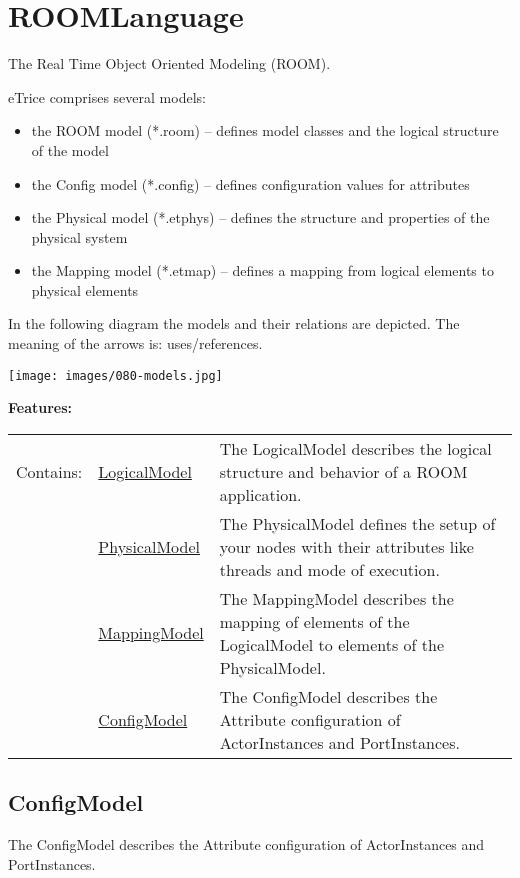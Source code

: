 \section{ROOMLanguage}
	\hypertarget{ref:ROOMLanguage}{}
	The Real Time Object Oriented Modeling (ROOM).
	
	eTrice comprises several models:
	
	\begin{itemize}
	\item the ROOM model (*.room) -- defines model classes and the logical structure of the model
	\item the Config model (*.config) -- defines configuration values for attributes
	\item the Physical model (*.etphys) -- defines the structure and properties of the physical system
	\item the Mapping model (*.etmap) -- defines a mapping from logical elements to physical elements
	\end{itemize}
	
	In the following diagram the models and their relations are depicted. The meaning of the arrows is: uses/references.
	\begin{center}
		\texttt{[image: images/080-models.jpg]}
	\end{center}
	
	\begingroup
	\textbf{Features:}
	\renewcommand{\arraystretch}{1.8} %
	\begin{longtable}{l|l p{}}
		\hline
	Contains: & \tabitem \hyperlink{ref:LogicalModel}{LogicalModel}  & The LogicalModel describes the logical structure and behavior of a ROOM application.\\
	& \tabitem \hyperlink{ref:PhysicalModel}{PhysicalModel}  & The PhysicalModel defines the setup of your nodes with their attributes like threads and mode of execution. \\
	& \tabitem \hyperlink{ref:MappingModel}{MappingModel}  & The MappingModel describes the mapping of elements of the LogicalModel to elements of the PhysicalModel. \\
	& \tabitem \hyperlink{ref:ConfigModel}{ConfigModel}  & The ConfigModel describes the Attribute configuration of ActorInstances and PortInstances.  \\
	\hline
	\end{longtable}
	\endgroup
	
\subsection{ConfigModel}
	\hypertarget{ref:ConfigModel}{}
	The ConfigModel describes the Attribute configuration of ActorInstances and PortInstances. 
		
